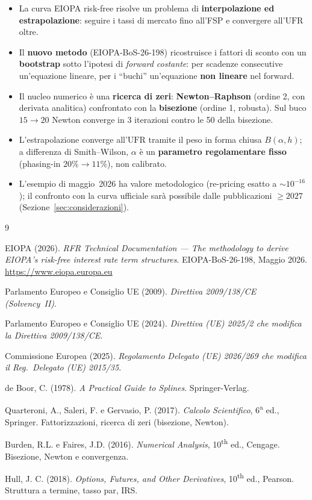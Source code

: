 \documentclass[11pt,a4paper]{article}
\theoremstyle{plain}
\theoremstyle{definition}
\theoremstyle{remark}
\newcommand{\UFR}{\mathrm{UFR}}
\begin{document}
\begin{itemize}
  \item La curva EIOPA risk-free risolve un problema di \textbf{interpolazione ed
        estrapolazione}: seguire i tassi di mercato fino all'FSP e convergere all'$\UFR$ oltre.
  \item Il \textbf{nuovo metodo} (EIOPA-BoS-26-198) ricostruisce i fattori di sconto con un
        \textbf{bootstrap} sotto l'ipotesi di \emph{forward costante}: per scadenze consecutive
        un'equazione lineare, per i ``buchi'' un'equazione \textbf{non lineare}
        nel forward.
  \item Il nucleo numerico \`e una \textbf{ricerca di zeri}: \textbf{Newton--Raphson} (ordine
        2, con derivata analitica) confrontato con la \textbf{bisezione} (ordine 1, robusta).
        Sul buco $15\!\to\!20$ Newton converge in 3 iterazioni contro le 50 della bisezione.
  \item L'estrapolazione converge all'$\UFR$ tramite il peso in forma chiusa $B(\alpha,h)$;
        a differenza di Smith--Wilson, $\alpha$ \`e un \textbf{parametro regolamentare fisso}
        (phasing-in $20\%\!\to\!11\%$), non calibrato.
  \item L'esempio di maggio~2026 ha valore metodologico (re-pricing esatto a $\sim10^{-16}$);
        il confronto con la curva ufficiale sar\`a possibile dalle pubblicazioni $\ge 2027$
        (Sezione~\ref{sec:considerazioni}).
\end{itemize}

\renewcommand{\refname}{Riferimenti bibliografici}
\begin{thebibliography}{9}

EIOPA (2026).
\textit{RFR Technical Documentation --- The methodology to derive EIOPA's risk-free
interest rate term structures}. EIOPA-BoS-26-198, Maggio 2026.
\url{https://www.eiopa.europa.eu}

Parlamento Europeo e Consiglio UE (2009).
\textit{Direttiva 2009/138/CE (Solvency~II)}.

Parlamento Europeo e Consiglio UE (2024).
\textit{Direttiva (UE) 2025/2 che modifica la Direttiva 2009/138/CE}.

Commissione Europea (2025).
\textit{Regolamento Delegato (UE) 2026/269 che modifica il Reg.\ Delegato (UE) 2015/35}.

de Boor, C. (1978).
\textit{A Practical Guide to Splines}. Springer-Verlag.

Quarteroni, A., Saleri, F. e Gervasio, P. (2017).
\textit{Calcolo Scientifico}, 6\textsuperscript{a} ed., Springer.
Fattorizzazioni, ricerca di zeri (bisezione, Newton).

Burden, R.L. e Faires, J.D. (2016).
\textit{Numerical Analysis}, 10\textsuperscript{th} ed., Cengage.
Bisezione, Newton e convergenza.

Hull, J. C. (2018).
\textit{Options, Futures, and Other Derivatives}, 10\textsuperscript{th} ed., Pearson.
Struttura a termine, tasso par, IRS.

\end{thebibliography}
\end{document}
